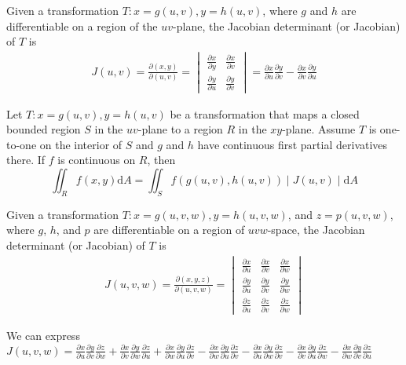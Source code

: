\documentclass[../calc3.tex]{subfiles}
\begin{document}
\begin{definition}
    Given a transformation $T:x=g(u,v), y=h(u,v)$, where $g$ and $h$ are differentiable 
    on a region of the $uv$-plane, the Jacobian determinant (or Jacobian) of $T$ is 
    \begin{align*}
        J(u,v)=\frac{\partial(x,y)}{\partial(u,v)}=
        \begin{vmatrix}
            \frac{\partial x}{\partial y} & \frac{\partial x}{\partial v}\\
            \frac{\partial y}{\partial u} & \frac{\partial y}{\partial v}
        \end{vmatrix}
        = \frac{\partial x}{\partial u}\frac{\partial y}{\partial v}-\frac{\partial x}{\partial v}\frac{\partial y}{\partial u}
    \end{align*}
\end{definition}
\begin{theorem}
    Let $T:x=g(u,v), y=h(u,v)$ be a transformation that maps a closed bounded region $S$ in the $uv$-plane 
    to a region $R$ in the $xy$-plane. Assume $T$ is one-to-one on the interior of $S$ and $g$ and $h$ 
    have continuous first partial derivatives there. If $f$ is continuous on $R$, then 
    \[\iint_R f(x,y)\mathrm{d}A = \iint_S f(g(u,v),h(u,v)) \mid J(u,v) \mid \mathrm{d}A\]
\end{theorem}

\begin{definition}
    Given a transformation $T:x=g(u,v,w), y=h(u,v,w)$, and $z=p(u,v,w)$, where $g$, $h$, 
    and $p$ are differentiable on a region of $uvw$-space, the Jacobian determinant (or Jacobian) of $T$ is 
    \begin{align*}
J(u,v,w)=\frac{\partial(x,y,z)}{\partial(u,v,w)} = 
\begin{vmatrix}
    \frac{\partial x}{\partial u} & \frac{\partial x}{\partial v} & \frac{\partial x}{\partial w}\\
    \frac{\partial y}{\partial u} & \frac{\partial y}{\partial v} & \frac{\partial y}{\partial w}\\
    \frac{\partial z}{\partial u} & \frac{\partial z}{\partial v} & \frac{\partial z}{\partial w}
\end{vmatrix}
    \end{align*}
\end{definition}

We can express $J(u,v,w) = \frac{\partial x}{\partial u}\frac{\partial y}{\partial v}\frac{\partial z}{\partial w}+\frac{\partial x}{\partial v}\frac{\partial y}{\partial w}\frac{\partial z}{\partial u}+\frac{\partial x}{\partial w}\frac{\partial y}{\partial u}\frac{\partial z}{\partial v}-\frac{\partial x}{\partial w}\frac{\partial y}{\partial u}\frac{\partial z}{\partial v}-\frac{\partial x}{\partial u}\frac{\partial y}{\partial w}\frac{\partial z}{\partial v}-\frac{\partial x}{\partial v}\frac{\partial y}{\partial u}\frac{\partial z}{\partial w}-\frac{\partial x}{\partial w}\frac{\partial y}{\partial v}\frac{\partial z}{\partial u}$
\end{document}
